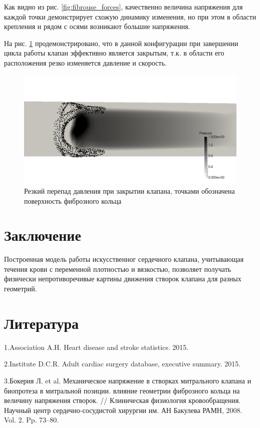 Как видно из рис. \ref{fig:fibrouse_forces}, качественно величина
напряжения для каждой точки демонстрирует схожую динамику изменения, но
при этом в области крепления и рядом с осями возникают большие
напряжения.

На рис. \ref{fig:pressure_limit} продемонстрировано, что в данной
конфигурации при завершении цикла работы клапан эффективно является
закрытым, т.к. в области его расположения резко изменяется давление и
скорость.

\begin{figure}[htbp]
\centering
\includegraphics{pressure_limit.png}
\caption{\label{fig:pressure_limit}Резкий перепад давления при закрытии
клапана, точками обозначена поверхность фиброзного кольца}
\end{figure}

\section{Заключение}\label{ux437ux430ux43aux43bux44eux447ux435ux43dux438ux435}

Построенная модель работы искусственног сердечного клапана, учитывающая
течения крови с переменной плотностью и вязкостью, позволяет получать
физически непротиворечивые картины движения створок клапана для разных
геометрий.

\section*{Литература}\label{ux43bux438ux442ux435ux440ux430ux442ux443ux440ux430}

1.Association A.H. Heart disease and stroke statistics. 2015.

2.Institute D.C.R. Adult cardiac surgery database, executive summary.
2015.

3.Бокерия Л. et al. Механическое напряжение в створках митрального
клапана и биопротеза в митральной позиции. влияние геометрии фиброзного
кольца на величину напряжения створок. // Клиническая физиология
кровообращения. Научный центр сердечно-сосудистой хирургии им. АН
Бакулева РАМН, 2008. Vol. 2. Pp. 73--80.

